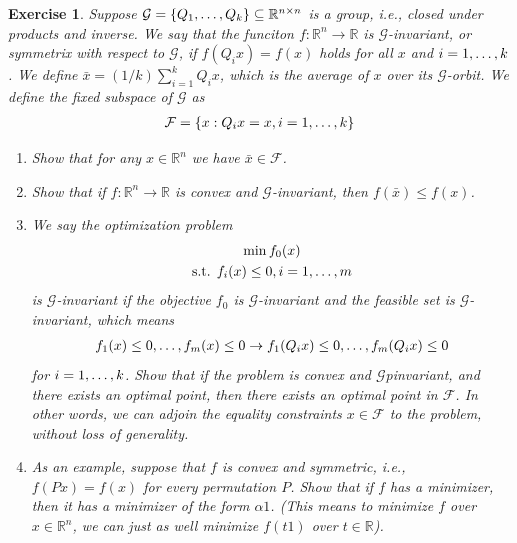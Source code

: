 \documentclass[12pt]{article}
\theoremstyle{colon}
\newtheorem{exercise}{Exercise}
\begin{document}
\clearpage

\begin{exercise}
  Suppose $\mathcal{G} = \{Q_1, \mathellipsis, Q_k \} \subseteq \mathbb{R}^{n \times n}$ is a group, i.e., closed under products and inverse. We say that the funciton $f : \mathbb{R}^n \rightarrow \mathbb{R}$ is $\mathcal{G}$-invariant, or \textit{symmetrix with respect to } $\mathcal{G}$, if $f(Q_i x) = f(x)$ holds for all $x$ and $i = 1, \mathellipsis, k$. We define $\bar{x} = (1/k) \sum_{i=1}^k Q_i x$, which is the average of $x$ over its $\mathcal{G}$-orbit. We define the \textit{fixed subspace} of $\mathcal{G}$ as
  \begin{gather*}
    \mathcal{F} = \{ x : Q_i x = x, i = 1, \mathellipsis, k \}
  \end{gather*}
  \begin{enumerate}[label=\alph*)]
      \item Show that for any $x \in \mathbb{R}^n$ we have $\bar{x} \in \mathcal{F}$.
      \item Show that if $f : \mathbb{R}^n \rightarrow \mathbb{R}$ is convex and $\mathcal{G}$-invariant, then $f(\bar{x}) \leq f(x)$.
      \item We say the optimization problem
        \begin{gather*}
          \min f_0(x) \\
          \text{s.t. } f_i(x) \leq 0, i = 1, \mathellipsis, m
        \end{gather*}
        is $\mathcal{G}$-invariant if the objective $f_0$ is $\mathcal{G}$-invariant and the feasible set is $\mathcal{G}$-invariant, which means
        \begin{gather*}
          f_1(x) \leq 0, \mathellipsis, f_m(x) \leq 0 \rightarrow f_1(Q_i x) \leq 0, \mathellipsis, f_m(Q_i x) \leq 0
        \end{gather*}
        for $i = 1, \mathellipsis, k$. Show that if the problem is convex and $\mathcal{G}$pinvariant, and there exists an optimal point, then there exists an optimal point in $\mathcal{F}$. In other words, we can adjoin the equality constraints $x \in \mathcal{F}$ to the problem, without loss of generality.
      \item As an example, suppose that $f$ is convex and symmetric, i.e., $f(Px) = f(x)$ for every permutation $P$. Show that if $f$ has a minimizer, then it has a minimizer of the form $\alpha 1$. (This means to minimize $f$ over $x \in \mathbb{R}^n$, we can just as well minimize $f(t 1)$ over $t \in \mathbb{R}$).
  \end{enumerate}
\end{exercise}
\end{document}
